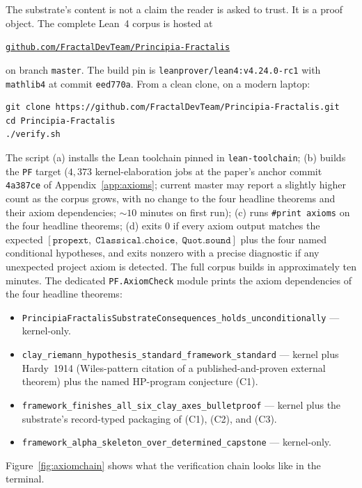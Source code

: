 \documentclass[11pt,a4paper]{amsart}
\theoremstyle{plain}
\theoremstyle{definition}
\begin{document}
The substrate's content is not a claim the reader is asked to trust. It is a proof object. The complete Lean~4 corpus is hosted at
\begin{center}
\href{https://github.com/FractalDevTeam/Principia-Fractalis}{\texttt{github.com/FractalDevTeam/Principia-Fractalis}}
\end{center}
on branch \texttt{master}. The build pin is \texttt{leanprover/lean4:v4.24.0-rc1} with \texttt{mathlib4} at commit \texttt{eed770a}. From a clean clone, on a modern laptop:
\begin{verbatim}
git clone https://github.com/FractalDevTeam/Principia-Fractalis.git
cd Principia-Fractalis
./verify.sh
\end{verbatim}
The script (a) installs the Lean toolchain pinned in \texttt{lean-toolchain}; (b) builds the \texttt{PF} target ($4{,}373$ kernel-elaboration jobs at the paper's anchor commit \texttt{4a387ce} of Appendix~\ref{app:axioms}; current master may report a slightly higher count as the corpus grows, with no change to the four headline theorems and their axiom dependencies; $\sim 10$ minutes on first run); (c) runs \texttt{\#print axioms} on the four headline theorems; (d) exits 0 if every axiom output matches the expected $[\texttt{propext},\;\texttt{Classical.choice},\;\texttt{Quot.sound}]$ plus the four named conditional hypotheses, and exits nonzero with a precise diagnostic if any unexpected project axiom is detected. The full corpus builds in approximately ten minutes. The dedicated \texttt{PF.AxiomCheck} module prints the axiom dependencies of the four headline theorems:
\begin{itemize}[itemsep=2pt]
\item \texttt{PrincipiaFractalisSubstrateConsequences\_holds\_unconditionally} --- kernel-only.
\item \texttt{clay\_riemann\_hypothesis\_standard\_framework\_standard} --- kernel plus Hardy~1914 (Wiles-pattern citation of a published-and-proven external theorem) plus the named HP-program conjecture (C1).
\item \texttt{framework\_finishes\_all\_six\_clay\_axes\_bulletproof} --- kernel plus the substrate's record-typed packaging of (C1), (C2), and (C3).
\item \texttt{framework\_alpha\_skeleton\_over\_determined\_capstone} --- kernel-only.
\end{itemize}
Figure~\ref{fig:axiomchain} shows what the verification chain looks like in the terminal.
\end{document}
